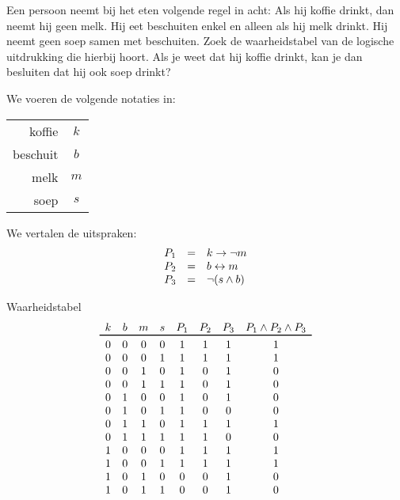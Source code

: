 \begin{oef}
Een persoon neemt bij het eten volgende regel in acht:
Als hij koffie drinkt, dan neemt hij geen melk.
Hij eet beschuiten enkel en alleen als hij melk drinkt.
Hij neemt geen soep samen met beschuiten.
Zoek de waarheidstabel van de logische uitdrukking die hierbij hoort. 
Als je weet dat hij koffie drinkt, kan je dan besluiten dat hij ook soep drinkt?
\begin{opl}
\begin{samepage}
We voeren de volgende notaties in:
\begin{center}
  \begin{tabular}{rc}
    koffie   & $k$ \\
    beschuit & $b$ \\
    melk     & $m$ \\
    soep     & $s$
  \end{tabular}
\end{center}
\end{samepage}
\begin{samepage}
We vertalen de uitspraken:
\[
  \begin{array}{rcl}
    P_1 & = & k \rightarrow \neg m \\
    P_2 & = & b \leftrightarrow m \\
    P_3 & = & \neg (s \wedge b)
  \end{array}
\]
\end{samepage}
\begin{samepage}
Waarheidstabel
\[
  \begin{array}{cccccccc}
    k & b & m & s & P_1 & P_2 & P_3 & P_1 \en P_2 \en P_3 \\
    \toprule
    0 & 0 & 0 & 0 & 1 & 1 & 1 & 1 \\
    0 & 0 & 0 & 1 & 1 & 1 & 1 & 1 \\
    0 & 0 & 1 & 0 & 1 & 0 & 1 & 0 \\
    0 & 0 & 1 & 1 & 1 & 0 & 1 & 0 \\
    0 & 1 & 0 & 0 & 1 & 0 & 1 & 0 \\
    0 & 1 & 0 & 1 & 1 & 0 & 0 & 0 \\
    0 & 1 & 1 & 0 & 1 & 1 & 1 & 1 \\
    0 & 1 & 1 & 1 & 1 & 1 & 0 & 0 \\
    1 & 0 & 0 & 0 & 1 & 1 & 1 & 1 \\
    1 & 0 & 0 & 1 & 1 & 1 & 1 & 1 \\
    1 & 0 & 1 & 0 & 0 & 0 & 1 & 0 \\
    1 & 0 & 1 & 1 & 0 & 0 & 1 & 0 \\

\end{array}\]
\end{samepage}
\end{opl}
\end{oef}
